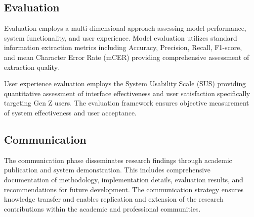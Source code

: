 \subsection{Evaluation}
Evaluation employs a multi-dimensional approach assessing model performance, system functionality, and user experience. Model evaluation utilizes standard information extraction metrics including Accuracy, Precision, Recall, F1-score, and mean Character Error Rate (mCER) providing comprehensive assessment of extraction quality. 

User experience evaluation employs the System Usability Scale (SUS) providing quantitative assessment of interface effectiveness and user satisfaction specifically targeting Gen Z users. The evaluation framework ensures objective measurement of system effectiveness and user acceptance.

\subsection{Communication}
The communication phase disseminates research findings through academic publication and system demonstration. This includes comprehensive documentation of methodology, implementation details, evaluation results, and recommendations for future development. The communication strategy ensures knowledge transfer and enables replication and extension of the research contributions within the academic and professional communities.